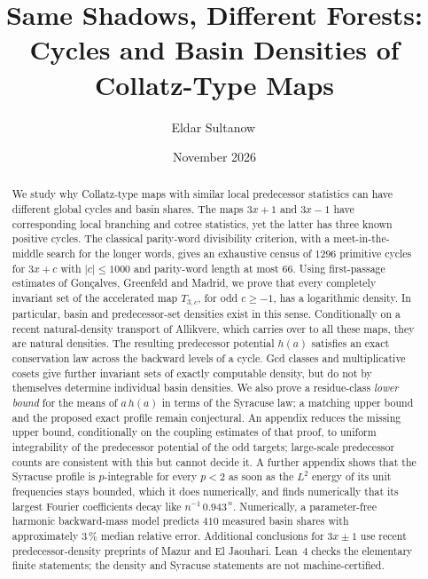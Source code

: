 \documentclass[12pt]{amsart}
\title[Same Shadows, Different Forests]{Same Shadows, Different Forests:\\ Cycles and Basin Densities of Collatz-Type Maps}
\author[E.\ Sultanow]{Eldar Sultanow\,\orcidlink{0000-0001-5257-2236}}
\date{November 2026}
\theoremstyle{definition}
\theoremstyle{remark}
\begin{document}
\begin{abstract}
We study why Collatz-type maps with similar local predecessor statistics can have different global cycles and basin shares. The maps $3x+1$ and $3x-1$ have corresponding local branching and cotree statistics, yet the latter has three known positive cycles. The classical parity-word divisibility criterion, with a meet-in-the-middle search for the longer words, gives an exhaustive census of $1296$ primitive cycles for $3x+c$ with $|c|\le1000$ and parity-word length at most $66$. Using first-passage estimates of Gon\c{c}alves, Greenfeld and Madrid, we prove that every completely invariant set of the accelerated map $T_{3,c}$, for odd $c\ge-1$, has a logarithmic density. In particular, basin and predecessor-set densities exist in this sense. Conditionally on a recent natural-density transport of Allikvere, which carries over to all these maps, they are natural densities. The resulting predecessor potential $h(a)$ satisfies an exact conservation law across the backward levels of a cycle. Gcd classes and multiplicative cosets give further invariant sets of exactly computable density, but do not by themselves determine individual basin densities. We also prove a residue-class \emph{lower bound} for the means of $a\,h(a)$ in terms of the Syracuse law; a matching upper bound and the proposed exact profile remain conjectural. An appendix reduces the missing upper bound, conditionally on the coupling estimates of that proof, to uniform integrability of the predecessor potential of the odd targets; large-scale predecessor counts are consistent with this but cannot decide it. A further appendix shows that the Syracuse profile is $p$-integrable for every $p<2$ as soon as the $L^2$ energy of its unit frequencies stays bounded, which it does numerically, and finds numerically that its largest Fourier coefficients decay like $n^{-1}\,0.943^{\,n}$. Numerically, a parameter-free harmonic backward-mass model predicts $410$ measured basin shares with approximately $3\,\%$ median relative error. Additional conclusions for $3x\pm1$ use recent predecessor-density preprints of Mazur and El Jaouhari. Lean~4 checks the elementary finite statements; the density and Syracuse statements are not machine-certified.
\end{abstract}

\begingroup
\let\MakeUppercase\relax
\clearpage\maketitle
\thispagestyle{empty}
\endgroup
\end{document}
